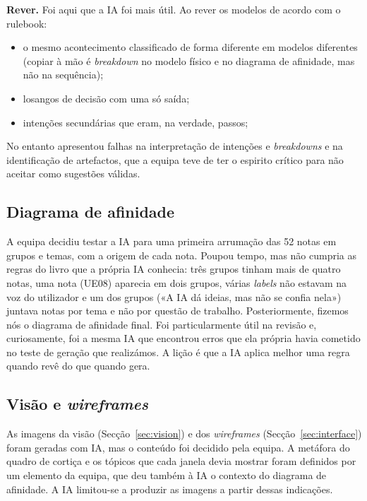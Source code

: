 \textbf{Rever.} Foi aqui que a IA foi mais útil. Ao rever os modelos de acordo com o rulebook:
\begin{itemize}
  \item o mesmo acontecimento classificado de forma diferente em modelos diferentes (copiar à mão é \textit{breakdown} no modelo físico e no 
  diagrama de afinidade, mas não na sequência);
  \item losangos de decisão com uma só saída;
  \item intenções secundárias que eram, na verdade, passos;
\end{itemize}
No entanto apresentou falhas na interpretação de intenções e \textit{breakdowns} e na identificação de artefactos, que a equipa teve de
ter o espirito crítico para não aceitar como sugestões válidas.

\subsection{Diagrama de afinidade}

A equipa decidiu testar a IA para uma primeira arrumação das 52 notas em grupos e temas, com a origem de cada nota. Poupou tempo, mas não cumpria as regras do 
livro que a própria IA conhecia: três grupos tinham mais de quatro notas, uma nota (UE08) aparecia em dois grupos, várias \textit{labels} 
não estavam na voz do utilizador e um dos grupos («A IA dá ideias, mas não se confia nela») juntava notas por tema e não por questão de trabalho.
Posteriormente, fizemos nós o diagrama de afinidade final. Foi particularmente útil na revisão e, curiosamente,
foi a mesma IA que encontrou erros que ela própria havia cometido no teste de geração que realizámos. A lição é que a IA 
aplica melhor uma regra quando revê do que quando gera.

\subsection{Visão e \textit{wireframes}}

As imagens da visão (Secção~\ref{sec:vision}) e dos \textit{wireframes} (Secção~\ref{sec:interface}) foram geradas com IA, mas o conteúdo foi decidido pela equipa. A metáfora do quadro de cortiça e os tópicos que cada janela devia mostrar foram definidos por um elemento da equipa, que deu também à IA o contexto do diagrama de afinidade. A IA limitou-se a produzir as imagens a partir dessas indicações.

